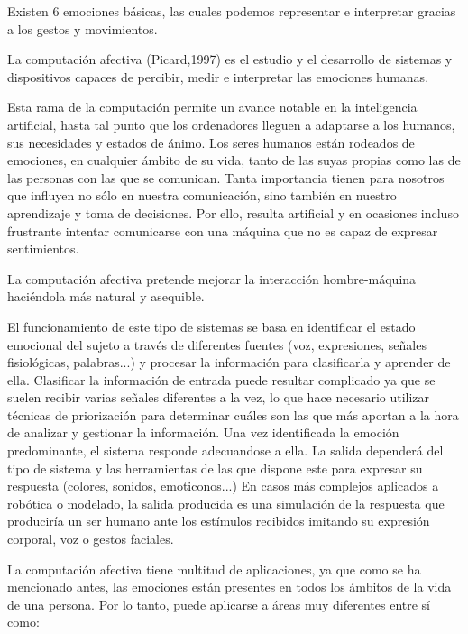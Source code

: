 Existen 6 emociones básicas, las cuales podemos representar e interpretar gracias a los gestos y movimientos.

La computación afectiva (Picard,1997) es el estudio y el desarrollo de sistemas y dispositivos capaces de percibir, medir e interpretar las emociones humanas.

Esta rama de la computación permite un avance notable en la inteligencia artificial, hasta tal punto que los ordenadores lleguen a adaptarse a los humanos, sus necesidades y estados de ánimo. Los seres humanos están rodeados de emociones, en cualquier ámbito de su vida, tanto de las suyas propias como las de las personas con las que se comunican. Tanta importancia tienen para nosotros que influyen no sólo en nuestra comunicación, sino también en nuestro aprendizaje y toma de decisiones. Por ello, resulta artificial y en ocasiones incluso frustrante intentar comunicarse con una máquina que no es capaz de expresar sentimientos. 

La computación afectiva pretende mejorar la interacción hombre-máquina haciéndola más natural y asequible. 

El funcionamiento de este tipo de sistemas se basa en identificar el estado emocional del sujeto a través de diferentes fuentes (voz, expresiones, señales fisiológicas, palabras...) y procesar la información para clasificarla y aprender de ella. Clasificar la información de entrada puede resultar complicado ya que se suelen recibir varias señales diferentes a la vez, lo que hace necesario utilizar técnicas de priorización para determinar cuáles son las que más aportan a la hora de analizar y gestionar la información. Una vez identificada la emoción predominante, el sistema responde adecuandose a ella. La salida dependerá del tipo de sistema y las herramientas de las que dispone este para expresar su respuesta (colores, sonidos, emoticonos...) En casos más complejos aplicados a robótica o modelado, la salida producida es una simulación de la respuesta que produciría un ser humano ante los estímulos recibidos imitando su expresión corporal, voz o gestos faciales.

La computación afectiva tiene multitud de aplicaciones, ya que como se ha mencionado antes, las emociones están presentes en todos los ámbitos de la vida de una persona. Por lo tanto, puede aplicarse a áreas muy diferentes entre sí como:

